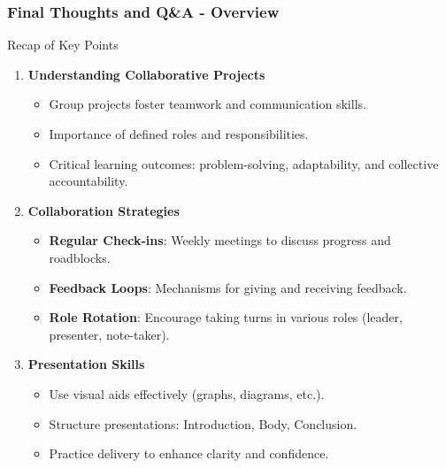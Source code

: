 \documentclass[aspectratio=169]{beamer}
\begin{document}
\begin{frame}[fragile]
    \frametitle{Final Thoughts and Q\&A - Overview}
    \begin{block}{Recap of Key Points}
        \begin{enumerate}
            \item \textbf{Understanding Collaborative Projects}
                \begin{itemize}
                    \item Group projects foster teamwork and communication skills.
                    \item Importance of defined roles and responsibilities.
                    \item Critical learning outcomes: problem-solving, adaptability, and collective accountability.
                \end{itemize}
            
            \item \textbf{Collaboration Strategies}
                \begin{itemize}
                    \item \textbf{Regular Check-ins}: Weekly meetings to discuss progress and roadblocks.
                    \item \textbf{Feedback Loops}: Mechanisms for giving and receiving feedback.
                    \item \textbf{Role Rotation}: Encourage taking turns in various roles (leader, presenter, note-taker).
                \end{itemize}
                
            \item \textbf{Presentation Skills}
                \begin{itemize}
                    \item Use visual aids effectively (graphs, diagrams, etc.).
                    \item Structure presentations: Introduction, Body, Conclusion.
                    \item Practice delivery to enhance clarity and confidence.
                \end{itemize}
        \end{enumerate}
    \end{block}
\end{frame}
\end{document}
